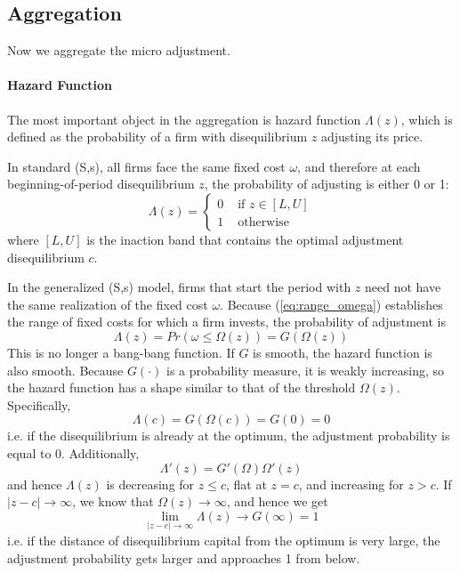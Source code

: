 \documentclass[12pt]{article}
\begin{document}
\subsection{Aggregation}

Now we aggregate the micro adjustment. 

\paragraph{Hazard Function \\ [6pt]}
The most important object in the aggregation is hazard function $\Lambda(z)$, which is defined as the probability of a firm with disequilibrium $z$ adjusting its price. 

In standard (S,s), all firms face the same fixed cost $\omega$, and therefore at each beginning-of-period disequilibrium $z$, the probability of adjusting is either 0 or 1:
\begin{equation}
	\Lambda(z) = \begin{cases}
		0 & \text{ if $z \in [L, U]$} \\
		1 & \text{ otherwise}
	\end{cases}
\end{equation} 
where $[L,U]$ is the inaction band that contains the optimal adjustment disequilibrium $c$.

In the generalized (S,s) model, firms that start the period with $z$ need not have the same realization of the fixed cost $\omega$. Because (\ref{eq:range_omega}) establishes the range of fixed costs for which a firm invests, the probability of adjustment is
\begin{equation}
	\Lambda(z) = Pr(\omega \leq \Omega(z)) = G(\Omega(z))
\end{equation}
This is no longer a bang-bang function. If $G$ is smooth, the hazard function is also smooth. Because $G(\cdot)$ is a probability measure, it is weakly increasing, so the hazard function has a shape similar to that of the threshold $\Omega(z)$. Specifically,
\[\Lambda(c) = G(\Omega(c)) = G(0) = 0\]
i.e. if the disequilibrium is already at the optimum, the adjustment probability is equal to 0. Additionally,
\[\Lambda'(z) = G'(\Omega) \Omega'(z)\]
and hence $\Lambda(z)$ is decreasing for $z \leq c$, flat at $z = c$, and increasing for $z > c$. If $|z -c| \to \infty$, we know that $\Omega(z) \to \infty$, and hence we get
\[\lim_{|z-c|\to \infty} \Lambda(z) \to G(\infty) = 1\]
i.e. if the distance of disequilibrium capital from the optimum is very large, the adjustment probability gets larger and approaches 1 from below.
\end{document}

